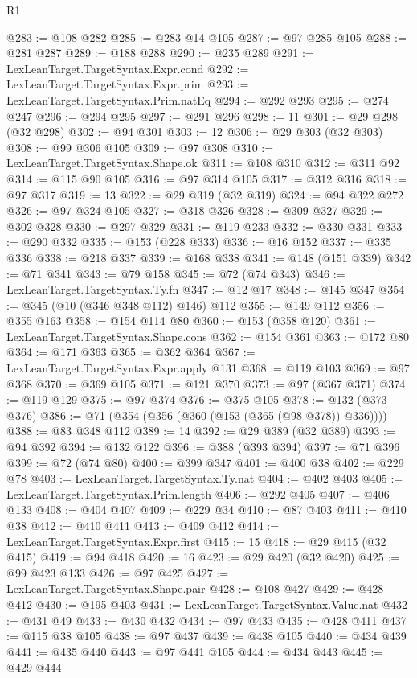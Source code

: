 \begin{lexlean}{R1}
\begin{coremodule}
{{{{{{{{{{{{{{{{{{{{{{{{{{{{{{{{{{{{{{{{{{{{{{{{{{{{{{{{{{{{{{{{{{{{{{{{{{{{{{{{{{{{{{{{{{{{{{{{{{{{{{{{{{{{{{{{{{{{{{{{{{{{{{{{{{{{{{{{{{{{{{{{{{{{{{{{{{{{{{{{{{{{{{{{{{{{{{{{{{{{{{{{{{@283 := @108 @282
@285 := @283 @14 @105
@287 := @97 @285 @105
@288 := @281 @287
@289 := @188 @288
@290 := @235 @289
@291 := LexLeanTarget.TargetSyntax.Expr.cond
@292 := LexLeanTarget.TargetSyntax.Expr.prim
@293 := LexLeanTarget.TargetSyntax.Prim.natEq
@294 := @292 @293
@295 := @274 @247
@296 := @294 @295
@297 := @291 @296
@298 := 11
@301 := @29 @298 (@32 @298)
@302 := @94 @301
@303 := 12
@306 := @29 @303 (@32 @303)
@308 := @99 @306 @105
@309 := @97 @308
@310 := LexLeanTarget.TargetSyntax.Shape.ok
@311 := @108 @310
@312 := @311 @92
@314 := @115 @90 @105
@316 := @97 @314 @105
@317 := @312 @316
@318 := @97 @317
@319 := 13
@322 := @29 @319 (@32 @319)
@324 := @94 @322 @272
@326 := @97 @324 @105
@327 := @318 @326
@328 := @309 @327
@329 := @302 @328
@330 := @297 @329
@331 := @119 @233
@332 := @330 @331
@333 := @290 @332
@335 := @153 (@228 @333)
@336 := @16 @152
@337 := @335 @336
@338 := @218 @337
@339 := @168 @338
@341 := @148 (@151 @339)
@342 := @71 @341
@343 := @79 @158
@345 := @72 (@74 @343)
@346 := LexLeanTarget.TargetSyntax.Ty.fn
@347 := @12 @17
@348 := @145 @347
@354 := @345 (@10 (@346 @348 @112) @146) @112
@355 := @149 @112
@356 := @355 @163
@358 := @154 @114 @80
@360 := @153 (@358 @120)
@361 := LexLeanTarget.TargetSyntax.Shape.cons
@362 := @154 @361
@363 := @172 @80
@364 := @171 @363
@365 := @362 @364
@367 := LexLeanTarget.TargetSyntax.Expr.apply @131
@368 := @119 @103
@369 := @97 @368
@370 := @369 @105
@371 := @121 @370
@373 := @97 (@367 @371)
@374 := @119 @129
@375 := @97 @374
@376 := @375 @105
@378 := @132 (@373 @376)
@386 := @71 (@354 (@356 (@360 (@153 (@365 (@98 @378)) @336))))
@388 := @83 @348 @112
@389 := 14
@392 := @29 @389 (@32 @389)
@393 := @94 @392
@394 := @132 @122
@396 := @388 (@393 @394)
@397 := @71 @396
@399 := @72 (@74 @80)
@400 := @399 @347
@401 := @400 @38
@402 := @229 @78
@403 := LexLeanTarget.TargetSyntax.Ty.nat
@404 := @402 @403
@405 := LexLeanTarget.TargetSyntax.Prim.length
@406 := @292 @405
@407 := @406 @133
@408 := @404 @407
@409 := @229 @34
@410 := @87 @403
@411 := @410 @38
@412 := @410 @411
@413 := @409 @412
@414 := LexLeanTarget.TargetSyntax.Expr.first
@415 := 15
@418 := @29 @415 (@32 @415)
@419 := @94 @418
@420 := 16
@423 := @29 @420 (@32 @420)
@425 := @99 @423 @133
@426 := @97 @425
@427 := LexLeanTarget.TargetSyntax.Shape.pair
@428 := @108 @427
@429 := @428 @412
@430 := @195 @403
@431 := LexLeanTarget.TargetSyntax.Value.nat
@432 := @431 @49
@433 := @430 @432
@434 := @97 @433
@435 := @428 @411
@437 := @115 @38 @105
@438 := @97 @437
@439 := @438 @105
@440 := @434 @439
@441 := @435 @440
@443 := @97 @441 @105
@444 := @434 @443
@445 := @429 @444
}}}}}}}}}}}}}}}}}}}}}}}}}}}}}}}}}}}}}}}}}}}}}}}}}}}}}}}}}}}}}}}}}}}}}}}}}}}}}}}}}}}}}}}}}}}}}}}}}}}}}}}}}}}}}}}}}}}}}}}}}}}}}}}}}}}}}}}}}}}}}}}}}}}}}}}}}}}}}}}}}}}}}}}}}}}}}}}}}}}}}}}}}}
\end{coremodule}
\end{lexlean}
